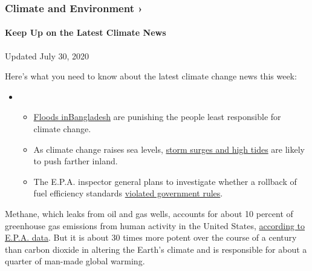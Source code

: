 \href{https://www.nytimes3xbfgragh.onion/section/climate?action=click\&pgtype=Article\&state=default\&region=MAIN_CONTENT_1\&context=storylines_keepup}{}

\hypertarget{climate-and-environment-}{%
\subsubsection{Climate and Environment
›}\label{climate-and-environment-}}

\hypertarget{keep-up-on-the-latest-climate-news}{%
\paragraph{Keep Up on the Latest Climate
News}\label{keep-up-on-the-latest-climate-news}}

Updated July 30, 2020

Here's what you need to know about the latest climate change news this
week:

\begin{itemize}
\item
  \begin{itemize}
  \tightlist
  \item
    \href{https://www.nytimes3xbfgragh.onion/2020/07/30/climate/bangladesh-floods.html?action=click\&pgtype=Article\&state=default\&region=MAIN_CONTENT_1\&context=storylines_keepup}{Floods
    in}\href{https://www.nytimes3xbfgragh.onion/2020/07/30/climate/bangladesh-floods.html?action=click\&pgtype=Article\&state=default\&region=MAIN_CONTENT_1\&context=storylines_keepup}{Bangladesh}
    are punishing the people least responsible for climate change.
  \item
    As climate change raises sea levels,
    \href{https://www.nytimes3xbfgragh.onion/2020/07/30/climate/sea-level-inland-floods.html?action=click\&pgtype=Article\&state=default\&region=MAIN_CONTENT_1\&context=storylines_keepup}{storm
    surges and high tides} are likely to push farther inland.
  \item
    The E.P.A. inspector general plans to investigate whether a rollback
    of fuel efficiency standards
    \href{https://www.nytimes3xbfgragh.onion/2020/07/27/climate/trump-fuel-efficiency-rule.html?action=click\&pgtype=Article\&state=default\&region=MAIN_CONTENT_1\&context=storylines_keepup}{violated
    government rules}.
  \end{itemize}
\end{itemize}

Methane, which leaks from oil and gas wells, accounts for about 10
percent of greenhouse gas emissions from human activity in the United
States,
\href{https://www.epa.gov/ghgemissions/overview-greenhouse-gases}{according
to E.P.A. data}. But it is about 30 times more potent over the course of
a century than carbon dioxide in altering the Earth's climate and is
responsible for about a quarter of man-made global warming.


